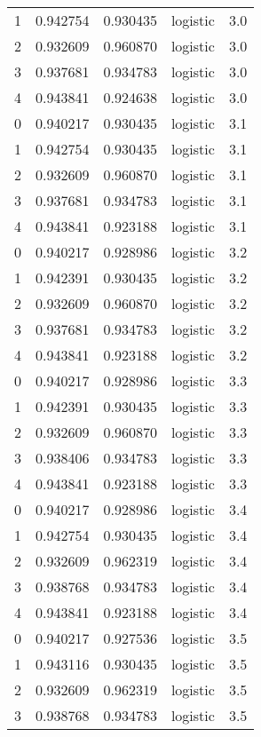 \begin{tabular}{rrrlr}
     1 & 0.942754 & 0.930435 & logistic &        3.0 \\
     2 & 0.932609 & 0.960870 & logistic &        3.0 \\
     3 & 0.937681 & 0.934783 & logistic &        3.0 \\
     4 & 0.943841 & 0.924638 & logistic &        3.0 \\
     0 & 0.940217 & 0.930435 & logistic &        3.1 \\
     1 & 0.942754 & 0.930435 & logistic &        3.1 \\
     2 & 0.932609 & 0.960870 & logistic &        3.1 \\
     3 & 0.937681 & 0.934783 & logistic &        3.1 \\
     4 & 0.943841 & 0.923188 & logistic &        3.1 \\
     0 & 0.940217 & 0.928986 & logistic &        3.2 \\
     1 & 0.942391 & 0.930435 & logistic &        3.2 \\
     2 & 0.932609 & 0.960870 & logistic &        3.2 \\
     3 & 0.937681 & 0.934783 & logistic &        3.2 \\
     4 & 0.943841 & 0.923188 & logistic &        3.2 \\
     0 & 0.940217 & 0.928986 & logistic &        3.3 \\
     1 & 0.942391 & 0.930435 & logistic &        3.3 \\
     2 & 0.932609 & 0.960870 & logistic &        3.3 \\
     3 & 0.938406 & 0.934783 & logistic &        3.3 \\
     4 & 0.943841 & 0.923188 & logistic &        3.3 \\
     0 & 0.940217 & 0.928986 & logistic &        3.4 \\
     1 & 0.942754 & 0.930435 & logistic &        3.4 \\
     2 & 0.932609 & 0.962319 & logistic &        3.4 \\
     3 & 0.938768 & 0.934783 & logistic &        3.4 \\
     4 & 0.943841 & 0.923188 & logistic &        3.4 \\
     0 & 0.940217 & 0.927536 & logistic &        3.5 \\
     1 & 0.943116 & 0.930435 & logistic &        3.5 \\
     2 & 0.932609 & 0.962319 & logistic &        3.5 \\
     3 & 0.938768 & 0.934783 & logistic &        3.5 \\

\end{tabular}
